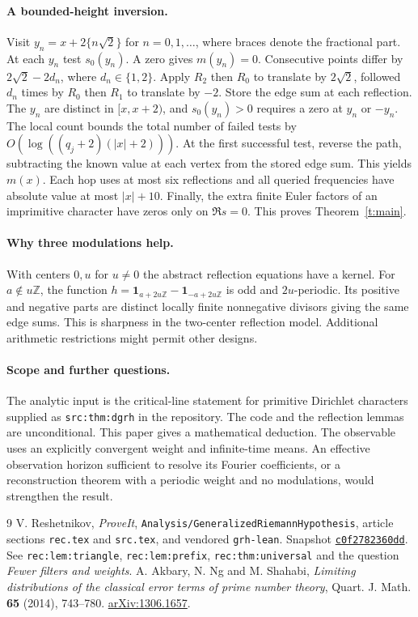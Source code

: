 \documentclass[11pt]{article}
\newcommand{\Z}{\mathbb Z}
\begin{document}
\paragraph{A bounded-height inversion.}
Visit $y_n=x+2\{n\sqrt2\}$ for $n=0,1,\ldots$, where braces denote the fractional part. At each $y_n$ test $s_0(y_n)$. A zero gives $m(y_n)=0$. Consecutive points differ by $2\sqrt2-2d_n$, where $d_n\in\{1,2\}$. Apply $R_2$ then $R_0$ to translate by $2\sqrt2$, followed $d_n$ times by $R_0$ then $R_1$ to translate by $-2$. Store the edge sum at each reflection. The $y_n$ are distinct in $[x,x+2)$, and $s_0(y_n)>0$ requires a zero at $y_n$ or $-y_n$. The local count bounds the total number of failed tests by $O(\log((q_j+2)(|x|+2)))$. At the first successful test, reverse the path, subtracting the known value at each vertex from the stored edge sum. This yields $m(x)$. Each hop uses at most six reflections and all queried frequencies have absolute value at most $|x|+10$. Finally, the extra finite Euler factors of an imprimitive character have zeros only on $\Re s=0$. This proves Theorem~\ref{t:main}.

\paragraph{Why three modulations help.}
With centers $0,u$ for $u\ne0$ the abstract reflection equations have a kernel. For $a\notin u\Z$, the function $h=\mathbf1_{a+2u\Z}-\mathbf1_{-a+2u\Z}$ is odd and $2u$-periodic. Its positive and negative parts are distinct locally finite nonnegative divisors giving the same edge sums. This is sharpness in the two-center reflection model. Additional arithmetic restrictions might permit other designs.

\paragraph{Scope and further questions.}
The analytic input is the critical-line statement for primitive Dirichlet characters supplied as \texttt{src:thm:dgrh} in the repository. The code and the reflection lemmas are unconditional. This paper gives a mathematical deduction. The observable uses an explicitly convergent weight and infinite-time means. An effective observation horizon sufficient to resolve its Fourier coefficients, or a reconstruction theorem with a periodic weight and no modulations, would strengthen the result.

\begin{thebibliography}{9}
 V. Reshetnikov, \emph{ProveIt}, \texttt{Analysis/GeneralizedRiemannHypothesis}, article sections \texttt{rec.tex} and \texttt{src.tex}, and vendored \texttt{grh-lean}. Snapshot
\href{https://github.com/VladimirReshetnikov/ProveIt/tree/c0f2782360ddffd79a20c6d828d582e214a2b8c3/Analysis/GeneralizedRiemannHypothesis}{\texttt{c0f2782360dd}}. See \texttt{rec:lem:triangle}, \texttt{rec:lem:prefix}, \texttt{rec:thm:universal} and the question \emph{Fewer filters and weights}.
 A. Akbary, N. Ng and M. Shahabi, \emph{Limiting distributions of the classical error terms of prime number theory}, Quart. J. Math. \textbf{65} (2014), 743--780. \href{https://arxiv.org/abs/1306.1657}{arXiv:1306.1657}.
\end{thebibliography}
\end{document}
